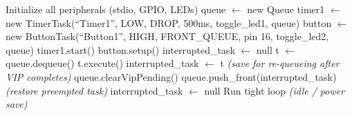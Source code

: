 \documentclass[a4paper,11pt]{article}
\begin{document}
\begin{algorithm}
\caption{Main Loop}
\begin{algorithmic}[1]
\State Initialize all peripherals (stdio, GPIO, LEDs)
\State queue $\leftarrow$ new Queue
\State timer1 $\leftarrow$ new TimerTask(``Timer1'', LOW, DROP, 500ms, toggle\_led1, queue)
\State button $\leftarrow$ new ButtonTask(``Button1'', HIGH, FRONT\_QUEUE, pin 16, toggle\_led2, queue)
\State timer1.start()
\State button.setup()
\State interrupted\_task $\leftarrow$ null
\vspace{0.3cm}
    \State t $\leftarrow$ queue.dequeue() 
        \State t.execute()
            \State interrupted\_task $\leftarrow$ t \quad \textit{(save for re-queueing after VIP completes)}
        \EndIf
            \State queue.clearVipPending()
                \State queue.push\_front(interrupted\_task) \quad \textit{(restore preempted task)}
                \State interrupted\_task $\leftarrow$ null
            \EndIf
        \EndIf
    \Else
        \State Run tight loop \quad \textit{(idle / power save)}
    \EndIf
\EndWhile
\end{algorithmic}
\end{algorithm}
\end{document}
